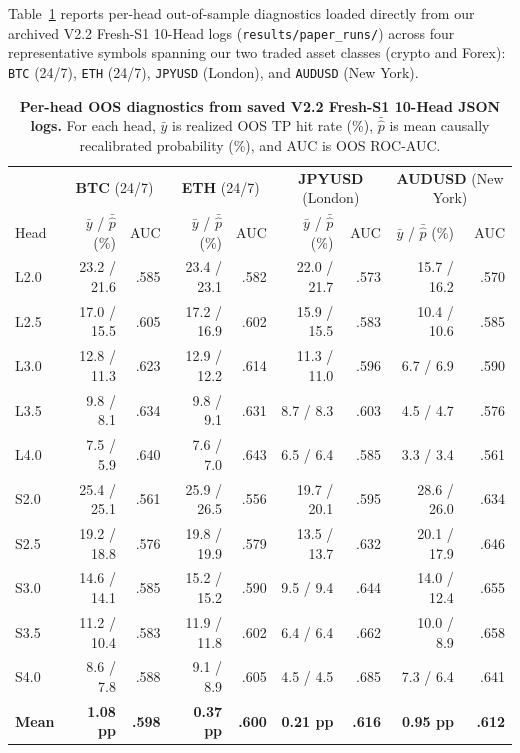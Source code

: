 \documentclass{article}
\begin{document}
Table~\ref{tab:app_heads} reports per-head out-of-sample diagnostics loaded directly from our archived V2.2 Fresh-S1 10-Head logs (\texttt{results/paper\_runs/}) across four representative symbols spanning our two traded asset classes (crypto and Forex): \texttt{BTC} (24/7), \texttt{ETH} (24/7), \texttt{JPYUSD} (London), and \texttt{AUDUSD} (New York).

\begin{table}[h]
  \centering
  \caption{\textbf{Per-head OOS diagnostics from saved V2.2 Fresh-S1 10-Head JSON logs.} For each head, $\bar{y}$ is realized OOS TP hit rate (\%), $\bar{\hat{p}}$ is mean causally recalibrated probability (\%), and AUC is OOS ROC-AUC.}
  \label{tab:app_heads}
  \scriptsize
  \setlength{\tabcolsep}{3.6pt}
  \begin{tabular}{@{}l|rr|rr|rr|rr@{}}
    \toprule
    & \multicolumn{2}{c|}{\textbf{BTC} (24/7)} & \multicolumn{2}{c|}{\textbf{ETH} (24/7)} & \multicolumn{2}{c|}{\textbf{JPYUSD} (London)} & \multicolumn{2}{c}{\textbf{AUDUSD} (New York)} \\
    Head & $\bar{y}$ / $\bar{\hat{p}}$ (\%) & AUC & $\bar{y}$ / $\bar{\hat{p}}$ (\%) & AUC & $\bar{y}$ / $\bar{\hat{p}}$ (\%) & AUC & $\bar{y}$ / $\bar{\hat{p}}$ (\%) & AUC \\
    \midrule
    L2.0 & 23.2 / 21.6 & .585 & 23.4 / 23.1 & .582 & 22.0 / 21.7 & .573 & 15.7 / 16.2 & .570 \\
    L2.5 & 17.0 / 15.5 & .605 & 17.2 / 16.9 & .602 & 15.9 / 15.5 & .583 & 10.4 / 10.6 & .585 \\
    L3.0 & 12.8 / 11.3 & .623 & 12.9 / 12.2 & .614 & 11.3 / 11.0 & .596 &  6.7 /  6.9 & .590 \\
    L3.5 &  9.8 /  8.1 & .634 &  9.8 /  9.1 & .631 &  8.7 /  8.3 & .603 &  4.5 /  4.7 & .576 \\
    L4.0 &  7.5 /  5.9 & .640 &  7.6 /  7.0 & .643 &  6.5 /  6.4 & .585 &  3.3 /  3.4 & .561 \\
    \midrule
    S2.0 & 25.4 / 25.1 & .561 & 25.9 / 26.5 & .556 & 19.7 / 20.1 & .595 & 28.6 / 26.0 & .634 \\
    S2.5 & 19.2 / 18.8 & .576 & 19.8 / 19.9 & .579 & 13.5 / 13.7 & .632 & 20.1 / 17.9 & .646 \\
    S3.0 & 14.6 / 14.1 & .585 & 15.2 / 15.2 & .590 &  9.5 /  9.4 & .644 & 14.0 / 12.4 & .655 \\
    S3.5 & 11.2 / 10.4 & .583 & 11.9 / 11.8 & .602 &  6.4 /  6.4 & .662 & 10.0 /  8.9 & .658 \\
    S4.0 &  8.6 /  7.8 & .588 &  9.1 /  8.9 & .605 &  4.5 /  4.5 & .685 &  7.3 /  6.4 & .641 \\
    \midrule
    \textbf{Mean} & \textbf{1.08 pp} & \textbf{.598} & \textbf{0.37 pp} & \textbf{.600} & \textbf{0.21 pp} & \textbf{.616} & \textbf{0.95 pp} & \textbf{.612} \\
    \bottomrule
  \end{tabular}
\end{table}
\end{document}

